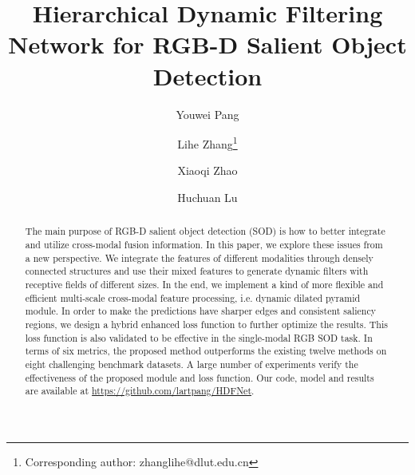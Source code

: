\documentclass[runningheads]{llncs}
\begin{document}
\pagestyle{headings}
\mainmatter
\def\ECCVSubNumber{4959}  

\title{Hierarchical Dynamic Filtering Network for RGB-D Salient Object Detection} 

\begin{comment}
\titlerunning{ECCV-20 submission ID \ECCVSubNumber}
\authorrunning{ECCV-20 submission ID \ECCVSubNumber}
\author{Anonymous ECCV submission}
\institute{Paper ID \ECCVSubNumber}
\end{comment}


\author{
 Youwei Pang \and
 Lihe Zhang\thanks{Corresponding author: zhanglihe@dlut.edu.cn} \and
 Xiaoqi Zhao \and
 Huchuan Lu
}
\maketitle

\begin{abstract}
 The main purpose of RGB-D salient object detection (SOD) is how to better integrate and utilize cross-modal fusion information. In this paper, we explore these issues from a new perspective. We integrate the features of different modalities through densely connected structures and use their mixed features to generate dynamic filters with receptive fields of different sizes. In the end, we implement a kind of more flexible and efficient multi-scale cross-modal feature processing, i.e. dynamic dilated pyramid module. In order to make the predictions have sharper edges and consistent saliency regions, we design a hybrid enhanced loss function to further optimize the results. This loss function is also validated to be effective in the single-modal RGB SOD task. In terms of six metrics, the proposed method outperforms the existing twelve methods on eight challenging benchmark datasets. A large number of experiments verify the effectiveness of the proposed module and loss function. Our code, model and results are available at \url{https://github.com/lartpang/HDFNet}.
\end{abstract}
\end{document}
